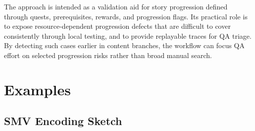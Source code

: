 \documentclass[conference]{IEEEtran}
\begin{document}
The approach is intended as a validation aid for story progression
defined through quests, prerequisites, rewards, and progression flags.
Its practical role is to expose resource-dependent progression defects
that are difficult to cover consistently through local testing, and to
provide replayable traces for QA triage. By detecting such cases earlier
in content branches, the workflow can focus QA effort on selected
progression risks rather than broad manual search.

\iffalse
\appendix
\section{Examples}
\subsection{SMV Encoding Sketch}
\end{document}
